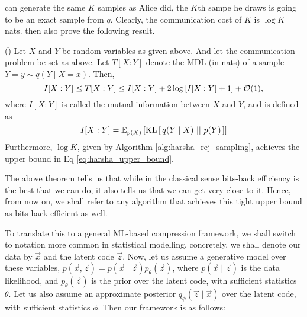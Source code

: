 can generate the same $K$ samples as Alice did, the $K$th sampe he draws is
going to be an exact sample from $q$. Clearly, the communication cost of $K$ is
$\log K$ nats. \cite{harsha2007communication} then also prove the following result.
\begin{theorem}{(\cite{harsha2007communication})}
  \label{thm:bits-back_efficiency}
Let $X$ and $Y$ be random variables as given above. And let the communication
problem be set as above. Let $T[X : Y]$ denote the MDL (in nats) of a sample
$Y=y \sim q(Y \mid X=x)$. Then,
\begin{equation}
\label{eq:harsha_upper_bound}
  I[X : Y] \leq T[X : Y] \leq I[X : Y] + 2\log \left[ I[X : Y] + 1 \right] + \Oh(1),
\end{equation}
where $I[ X : Y ]$ is called the mutual information between $X$ and $Y$, and is
defined as
\[
  I[ X : Y ] = \Exp{\KL{q(Y \mid X)}{p(Y)}}{p(X)}
\]
Furthermore, $\log K$, given by Algorithm \ref{alg:harsha_rej_sampling},
achieves the upper bound in Eq \ref{eq:harsha_upper_bound}.
\end{theorem}
\par
The above theorem tells us that while in the classical sense bits-back efficiency
is the best that we can do, it also tells us that we can get very close to it.
Hence, from now on, we shall refer to any algorithm that achieves this tight
upper bound as bits-back efficient as well.
\par
To translate this to a general ML-based compression framework, we shall switch
to notation more common in statistical modelling, concretely, we shall denote
our data by $\vec{x}$ and the latent code $\vec{z}$. Now, let us assume a
generative model over these variables, $p(\vec{x}, \vec{z}) = p(\vec{x} \mid
\vec{z})p_\theta(\vec{z})$, where $p(\vec{x} \mid \vec{z})$ is the data likelihood, and
$p_\theta(\vec{z})$ is the prior over the latent code, with sufficient
statistics $\theta$. Let us also assume an approximate posterior $q_\phi(\vec{z}
\mid \vec{x})$ over the latent code, with sufficient statistics $\phi$. Then our
framework is as follows:
